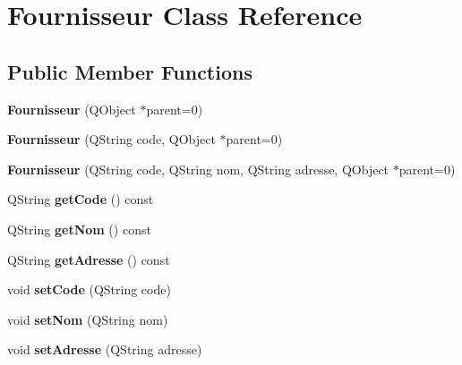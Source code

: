 \hypertarget{class_fournisseur}{
\section{Fournisseur Class Reference}
\label{de/d1a/class_fournisseur}
}
\subsection*{Public Member Functions}
\begin{DoxyCompactItemize}
\item 
\hypertarget{class_fournisseur_a38d96476a07abd831c7a74d494e7fe69}{
{\bfseries Fournisseur} (QObject $\ast$parent=0)}
\label{de/d1a/class_fournisseur_a38d96476a07abd831c7a74d494e7fe69}

\item 
\hypertarget{class_fournisseur_aaa914850a9c665a666f356dedab1b303}{
{\bfseries Fournisseur} (QString code, QObject $\ast$parent=0)}
\label{de/d1a/class_fournisseur_aaa914850a9c665a666f356dedab1b303}

\item 
\hypertarget{class_fournisseur_a0707ab51199fdb39a785722c00c3eb88}{
{\bfseries Fournisseur} (QString code, QString nom, QString adresse, QObject $\ast$parent=0)}
\label{de/d1a/class_fournisseur_a0707ab51199fdb39a785722c00c3eb88}

\item 
\hypertarget{class_fournisseur_a63310eeb312238add77390ceb4adf9b6}{
QString {\bfseries getCode} () const }
\label{de/d1a/class_fournisseur_a63310eeb312238add77390ceb4adf9b6}

\item 
\hypertarget{class_fournisseur_a25f1575ae5459478204547b6223ad1c9}{
QString {\bfseries getNom} () const }
\label{de/d1a/class_fournisseur_a25f1575ae5459478204547b6223ad1c9}

\item 
\hypertarget{class_fournisseur_a6727bd4b861dd60a7d3e62261f397da5}{
QString {\bfseries getAdresse} () const }
\label{de/d1a/class_fournisseur_a6727bd4b861dd60a7d3e62261f397da5}

\item 
\hypertarget{class_fournisseur_a661991ddd3d4b344bd65968d1168eee9}{
void {\bfseries setCode} (QString code)}
\label{de/d1a/class_fournisseur_a661991ddd3d4b344bd65968d1168eee9}

\item 
\hypertarget{class_fournisseur_a54e2fe8b31f1ae66ab5652e744cb5d59}{
void {\bfseries setNom} (QString nom)}
\label{de/d1a/class_fournisseur_a54e2fe8b31f1ae66ab5652e744cb5d59}

\item 
\hypertarget{class_fournisseur_a865981cbf61ea1371d05887dfbabde48}{
void {\bfseries setAdresse} (QString adresse)}
\label{de/d1a/class_fournisseur_a865981cbf61ea1371d05887dfbabde48}

\end{DoxyCompactItemize}
